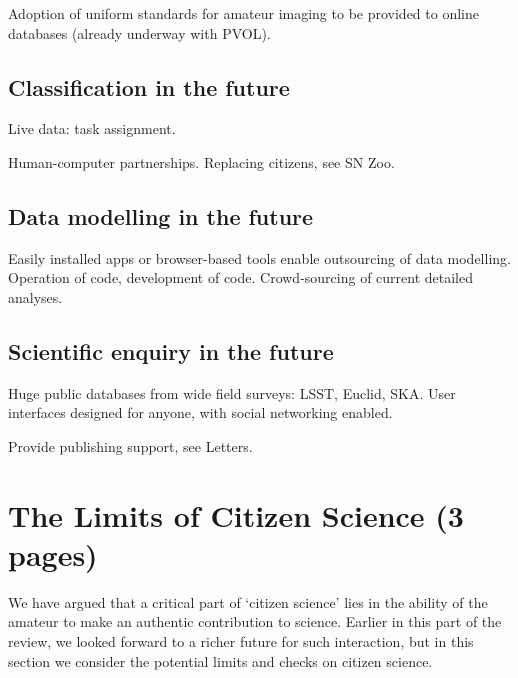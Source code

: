 \documentclass{ar2e}
\begin{document}
Adoption of uniform standards for amateur imaging to be provided to online
databases (already underway with PVOL).



\subsection{Classification in the future}
\label{sec:future:class}

Live data: task assignment. 

Human-computer partnerships. Replacing citizens, see SN Zoo.



\subsection{Data modelling in the future}
\label{sec:future:models}

Easily installed apps or browser-based tools enable outsourcing of data
modelling. Operation of code, development of code. Crowd-sourcing of current
detailed analyses.



\subsection{Scientific enquiry in the future}
\label{sec:future:enquiry}

Huge public databases from wide field surveys: LSST, Euclid, SKA. User
interfaces designed for anyone, with social networking enabled. 

Provide publishing support, see Letters.



\section{The Limits of Citizen Science (3 pages)}
\label{sec:limits}

We have argued that a critical part of `citizen science' lies in the ability of
the amateur to make an authentic contribution to science. Earlier in this part
of the review, we looked forward to a richer future for such interaction, but in
this section we consider the potential limits and checks on citizen science. 
\end{document}
